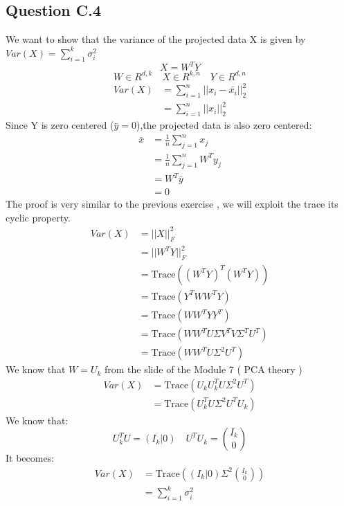 \documentclass[a4paper]{scrartcl}
\newcommand{\tr}{\text{Trace}}
\begin{document}
\subsection*{Question C.4}
We want to show that the variance of the projected data X is given by $Var(X) = \sum_{i=1}^{k} \sigma_i^2$\\
\[
X = W^T Y
\]
\[
W \in R^{d,k} \quad X \in R^{k,n} \quad Y \in R^{d,n}
\]
\begin{align*}
    Var(X) &= \sum_{i=1}^{n} || x_i - \bar{x_i}||_2^2\\
    &= \sum_{i=1}^{n} || x_i ||^2_2
\end{align*}
Since Y is zero centered ($\bar{y}=0$),the projected data is also zero centered:
\begin{align*}
    \bar{x} &=\frac{1}{n}\sum_{j=1}^{n} x_j\\
    &= \frac{1}{n}\sum_{j=1}^{n} W^T y_j\\
    &= W^T \bar{y}\\
    &=0
\end{align*}
The proof is very similar to the previous exercise , we will exploit the trace its cyclic property.
\begin{align*}
    Var(X) &= ||X||_F^2\\
    &= ||W^T Y||_F^2\\
    &= \tr((W^T Y)^T (W^T Y) )\\
    &= \tr(Y^T W W^T Y)\\
    &= \tr(W W^T Y Y^T)\\
    &= \tr(W W^T U \Sigma V^T V \Sigma^T U^T)\\
    &= \tr(W W^T U \Sigma^2 U^T)
\end{align*}
We know that $W=U_k$ from the slide of the Module 7 ( PCA theory )
\begin{align*}
    Var(X) &= \tr(U_k U_k^T U \Sigma^2 U^T)\\
    &= \tr(U_k^T U \Sigma^2 U^T U_k )
\end{align*}
We know that:
\[
U_k^T U = (I_k | 0) \quad U^T U_k = \binom{I_k}{0} 
\]
It becomes:
\begin{align*}
    Var(X) &= \tr\left((I_k | 0) \Sigma^2 \binom{I_k}{0}\right)\\
    &= \sum_{i=1}^{k} \sigma_i^2
\end{align*}
\end{document}
